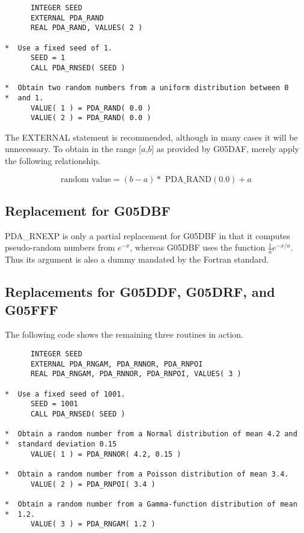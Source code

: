 \begin{verbatim}
      INTEGER SEED
      EXTERNAL PDA_RAND
      REAL PDA_RAND, VALUES( 2 )

*  Use a fixed seed of 1.
      SEED = 1
      CALL PDA_RNSED( SEED )

*  Obtain two random numbers from a uniform distribution between 0
*  and 1.
      VALUE( 1 ) = PDA_RAND( 0.0 )
      VALUE( 2 ) = PDA_RAND( 0.0 )
\end{verbatim}

   The EXTERNAL statement is recommended, although in many cases it
   will be unnecessary.  To obtain  in the range [$a$,$b$] as
   provided by G05DAF, merely apply the following relationship.

   \[  \mbox{random value} = (b - a) * \mbox{ PDA\_RAND}( 0.0 ) + a \]

\subsection{Replacement for G05DBF}

   PDA\_RNEXP is only a partial replacement for G05DBF in that it
   computes pseudo-random numbers from $e^{-x}$, whereas G05DBF
   uses the function $\frac{1}{a}e^{-x/a}$.  Thus its argument is
   also a dummy mandated by the Fortran standard.

\subsection{Replacements for G05DDF, G05DRF, and G05FFF}

The following code shows the remaining three routines in action.

\begin{verbatim}
      INTEGER SEED
      EXTERNAL PDA_RNGAM, PDA_RNNOR, PDA_RNPOI
      REAL PDA_RNGAM, PDA_RNNOR, PDA_RNPOI, VALUES( 3 )

*  Use a fixed seed of 1001.
      SEED = 1001
      CALL PDA_RNSED( SEED )

*  Obtain a random number from a Normal distribution of mean 4.2 and
*  standard deviation 0.15
      VALUE( 1 ) = PDA_RNNOR( 4.2, 0.15 )

*  Obtain a random number from a Poisson distribution of mean 3.4.
      VALUE( 2 ) = PDA_RNPOI( 3.4 )

*  Obtain a random number from a Gamma-function distribution of mean
*  1.2.
      VALUE( 3 ) = PDA_RNGAM( 1.2 )
\end{verbatim}

